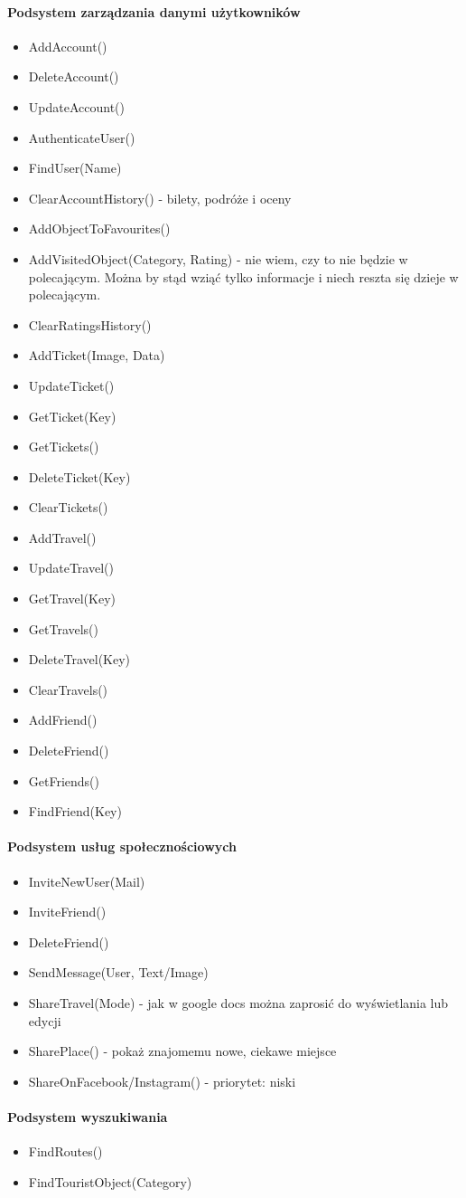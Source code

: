 \documentclass[10pt,twoside,a4paper]{report}
\begin{document}
\paragraph{Podsystem zarządzania danymi użytkowników}
\begin{itemize}
\item AddAccount()
\item DeleteAccount()
\item UpdateAccount()
\item AuthenticateUser()
\item FindUser(Name)
\item ClearAccountHistory() - bilety, podróże i oceny

\item AddObjectToFavourites()
\item AddVisitedObject(Category, Rating) - nie wiem, czy to nie będzie w polecającym.
Można by stąd wziąć tylko informacje i niech reszta się dzieje w polecającym.
\item ClearRatingsHistory()

\item AddTicket(Image, Data)
\item UpdateTicket()
\item GetTicket(Key)
\item GetTickets()
\item DeleteTicket(Key)
\item ClearTickets()

\item AddTravel()
\item UpdateTravel()
\item GetTravel(Key)
\item GetTravels()
\item DeleteTravel(Key)
\item ClearTravels()

\item AddFriend()
\item DeleteFriend()
\item GetFriends()
\item FindFriend(Key)
\end{itemize}

\paragraph{Podsystem usług społecznościowych}
\begin{itemize}
\item InviteNewUser(Mail)
\item InviteFriend()
\item DeleteFriend()
\item SendMessage(User, Text/Image)

\item ShareTravel(Mode) - jak w google docs można zaprosić do wyświetlania lub edycji
\item SharePlace() - pokaż znajomemu nowe, ciekawe miejsce
\item ShareOnFacebook/Instagram() - priorytet: niski
\end{itemize}

\paragraph{Podsystem wyszukiwania}
\begin{itemize}
\item FindRoutes()
\item FindTouristObject(Category)
\end{itemize}
\end{document}
